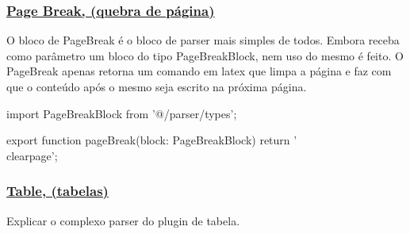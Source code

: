 \subsubsection{\underline{Page Break, (quebra de página)}}

O bloco de PageBreak é o bloco de parser mais simples de todos.
Embora receba como parâmetro um bloco do tipo PageBreakBlock,
nem uso do mesmo é feito.
O PageBreak apenas retorna um comando em
\acrshort{latex}
que limpa a página e faz com que o conteúdo após o mesmo
seja escrito na próxima página.

\begin{getPageBreak1}
import { PageBreakBlock } from '@/parser/types';

export function pageBreak(block: PageBreakBlock){
    return '\\clearpage';
}
\end{getPageBreak1}

\subsubsection{\underline{Table, (tabelas)}}

Explicar o complexo parser do plugin de tabela.

